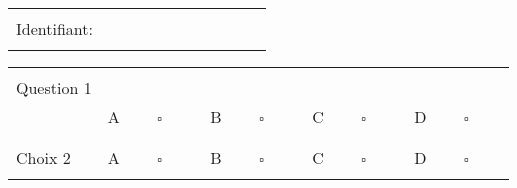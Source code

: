 \documentclass[]{article}
\begin{document}
\begin{flushright}
\begin{tabular}{|l|}
\hline
 \\
Identifiant: $\qquad \qquad \qquad \qquad \qquad$ \\
 \\
\hline
\end{tabular}
\end{flushright}

\begin{tabular}{| l l l l l |}
\hline
 & & & & \\
Question 1 & & & & \\
 & A $\qquad \square \qquad$ & B $\qquad \square \qquad$ & C $\qquad \square \qquad$ & D $\qquad \square \qquad$ \\ 
 & & & &  \\
\hline
 & & & & \\
Choix 2 & A $\qquad \square \qquad$ & B $\qquad \square \qquad$ & C $\qquad \square \qquad$ & D $\qquad \square \qquad$ \\ 
 & & & &  \\
\hline
\end{tabular}
\end{document}
